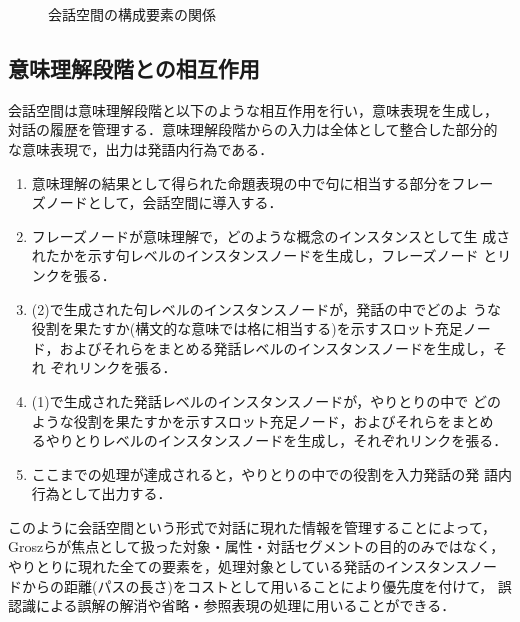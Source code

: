 \begin{figure}[htbp]
\begin{center}
\end{center}
\caption{会話空間の構成要素の関係}
\label{cs}
\end{figure}

\subsection{意味理解段階との相互作用}

会話空間は意味理解段階と以下のような相互作用を行い，意味表現を生成し，
対話の履歴を管理する．意味理解段階からの入力は全体として整合した部分的
な意味表現で，出力は発語内行為である．

\begin{enumerate}

\item 意味理解の結果として得られた命題表現の中で句に相当する部分をフレー
ズノードとして，会話空間に導入する．

\item フレーズノードが意味理解で，どのような概念のインスタンスとして生
成されたかを示す句レベルのインスタンスノードを生成し，フレーズノード
とリンクを張る．

\item (2)で生成された句レベルのインスタンスノードが，発話の中でどのよ
うな役割を果たすか(構文的な意味では格に相当する)を示すスロット充足ノー
ド，およびそれらをまとめる発話レベルのインスタンスノードを生成し，それ
ぞれリンクを張る．

\item (1)で生成された発話レベルのインスタンスノードが，やりとりの中で
どのような役割を果たすかを示すスロット充足ノード，およびそれらをまとめ
るやりとりレベルのインスタンスノードを生成し，それぞれリンクを張る．

\item ここまでの処理が達成されると，やりとりの中での役割を入力発話の発
語内行為として出力する．

\end{enumerate}

このように会話空間という形式で対話に現れた情報を管理することによって，
Groszらが焦点として扱った対象・属性・対話セグメントの目的のみではなく，
やりとりに現れた全ての要素を，処理対象としている発話のインスタンスノー
ドからの距離(パスの長さ)をコストとして用いることにより優先度を付けて，
誤認識による誤解の解消や省略・参照表現の処理に用いることができる．

